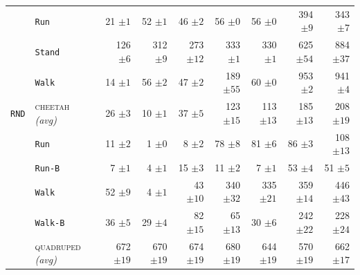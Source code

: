 \documentclass{article}
\theoremstyle{plain}
\theoremstyle{definition}
\theoremstyle{remark}
\newcommand{\domainavg}[1]{\textsc{#1} \textit{(avg)}}
\begin{document}
\begin{table}
\begin{tabular}{l l r r r r r r r}
& \hspace{.5em}\texttt{Run} & 21 ${\scriptstyle \pm 1}$ & 52 ${\scriptstyle \pm 1}$ & 46 ${\scriptstyle \pm 2}$ & 56 ${\scriptstyle \pm 0}$ & 56 ${\scriptstyle \pm 0}$ & 394 ${\scriptstyle \pm 9}$ & 343 ${\scriptstyle \pm 7}$ \\
& \hspace{.5em}\texttt{Stand} & 126 ${\scriptstyle \pm 6}$ & 312 ${\scriptstyle \pm 9}$ & 273 ${\scriptstyle \pm 12}$ & 333 ${\scriptstyle \pm 1}$ & 330 ${\scriptstyle \pm 1}$ & 625 ${\scriptstyle \pm 54}$ & 884 ${\scriptstyle \pm 37}$ \\
& \hspace{.5em}\texttt{Walk} & 14 ${\scriptstyle \pm 1}$ & 56 ${\scriptstyle \pm 2}$ & 47 ${\scriptstyle \pm 2}$ & 189 ${\scriptstyle \pm 55}$ & 60 ${\scriptstyle \pm 0}$ & 953 ${\scriptstyle \pm 2}$ & 941 ${\scriptstyle \pm 4}$ \\
\addlinespace
\midrule
 \rowcolor{gray!15}  \cellcolor{white} \texttt{RND} & \domainavg{cheetah} & 26 ${\scriptstyle \pm 3}$ & 10 ${\scriptstyle \pm 1}$ & 37 ${\scriptstyle \pm 5}$ & 123 ${\scriptstyle \pm 15}$ & 113 ${\scriptstyle \pm 13}$ & 185 ${\scriptstyle \pm 13}$ & 208 ${\scriptstyle \pm 19}$ \\
& \hspace{.5em}\texttt{Run} & 11 ${\scriptstyle \pm 2}$ & 1 ${\scriptstyle \pm 0}$ & 8 ${\scriptstyle \pm 2}$ & 78 ${\scriptstyle \pm 8}$ & 81 ${\scriptstyle \pm 6}$ & 86 ${\scriptstyle \pm 3}$ & 108 ${\scriptstyle \pm 13}$ \\
& \hspace{.5em}\texttt{Run-B} & 7 ${\scriptstyle \pm 1}$ & 4 ${\scriptstyle \pm 1}$ & 15 ${\scriptstyle \pm 3}$ & 11 ${\scriptstyle \pm 2}$ & 7 ${\scriptstyle \pm 1}$ & 53 ${\scriptstyle \pm 4}$ & 51 ${\scriptstyle \pm 5}$ \\
& \hspace{.5em}\texttt{Walk} & 52 ${\scriptstyle \pm 9}$ & 4 ${\scriptstyle \pm 1}$ & 43 ${\scriptstyle \pm 10}$ & 340 ${\scriptstyle \pm 32}$ & 335 ${\scriptstyle \pm 21}$ & 359 ${\scriptstyle \pm 14}$ & 446 ${\scriptstyle \pm 43}$ \\
& \hspace{.5em}\texttt{Walk-B} & 36 ${\scriptstyle \pm 5}$ & 29 ${\scriptstyle \pm 4}$ & 82 ${\scriptstyle \pm 15}$ & 65 ${\scriptstyle \pm 13}$ & 30 ${\scriptstyle \pm 6}$ & 242 ${\scriptstyle \pm 22}$ & 228 ${\scriptstyle \pm 24}$ \\
\addlinespace
 \rowcolor{gray!15}  \cellcolor{white} & \domainavg{quadruped} & 672 ${\scriptstyle \pm 19}$ & 670 ${\scriptstyle \pm 19}$ & 674 ${\scriptstyle \pm 19}$ & 680 ${\scriptstyle \pm 19}$ & 644 ${\scriptstyle \pm 19}$ & 570 ${\scriptstyle \pm 19}$ & 662 ${\scriptstyle \pm 17}$ \\

\end{tabular}
\end{table}
\end{document}
